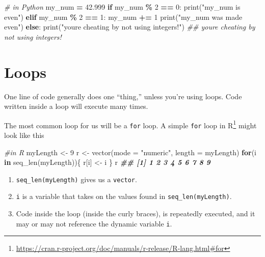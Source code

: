 \documentclass[
  12pt,
  krantz2]{krantz}
\makeatletter
\newenvironment{Shaded}{\begin{snugshade}}{\end{snugshade}}
\newcommand{\AttributeTok}[1]{\textcolor[rgb]{0.61,0.61,0.61}{#1}}
\newcommand{\BuiltInTok}[1]{#1}
\newcommand{\CommentTok}[1]{\textcolor[rgb]{0.37,0.37,0.37}{\textit{#1}}}
\newcommand{\ControlFlowTok}[1]{\textcolor[rgb]{0.27,0.27,0.27}{\textbf{#1}}}
\newcommand{\DecValTok}[1]{\textcolor[rgb]{0.06,0.06,0.06}{#1}}
\newcommand{\DocumentationTok}[1]{\textcolor[rgb]{0.37,0.37,0.37}{\textbf{\textit{#1}}}}
\newcommand{\FloatTok}[1]{\textcolor[rgb]{0.06,0.06,0.06}{#1}}
\newcommand{\FunctionTok}[1]{\textcolor[rgb]{0,0,0}{#1}}
\newcommand{\NormalTok}[1]{#1}
\newcommand{\OperatorTok}[1]{\textcolor[rgb]{0.43,0.43,0.43}{\textbf{#1}}}
\newcommand{\OtherTok}[1]{\textcolor[rgb]{0.37,0.37,0.37}{#1}}
\newcommand{\StringTok}[1]{\textcolor[rgb]{0.5,0.5,0.5}{#1}}
\providecommand{\tightlist}{%
  \setlength{\itemsep}{0pt}\setlength{\parskip}{0pt}}
\renewcommand{\href}[2]{#2\footnote{\url{#1}}}
\newenvironment{kframe}{%
\medskip{}
\setlength{\fboxsep}{.8em}
 \def\at@end@of@kframe{}%
 \ifinner\ifhmode%
  \def\at@end@of@kframe{\end{minipage}}%
  \begin{minipage}{\columnwidth}%
 \fi\fi%
 \def\FrameCommand##1{\hskip\@totalleftmargin \hskip-\fboxsep
 \colorbox{shadecolor}{##1}\hskip-\fboxsep
     \hskip-\linewidth \hskip-\@totalleftmargin \hskip\columnwidth}%
 \MakeFramed {\advance\hsize-\width
   \@totalleftmargin\z@ \linewidth\hsize
   \@setminipage}}%
 {\par\unskip\endMakeFramed%
 \at@end@of@kframe}
\renewenvironment{Shaded}{\begin{kframe}}{\end{kframe}}
\makeatother
\begin{document}
\begin{Shaded}
\begin{Highlighting}[]
\CommentTok{\# in Python}
\NormalTok{my\_num }\OperatorTok{=} \FloatTok{42.999}
\ControlFlowTok{if}\NormalTok{ my\_num }\OperatorTok{\%} \DecValTok{2} \OperatorTok{==} \DecValTok{0}\NormalTok{:}
    \BuiltInTok{print}\NormalTok{(}\StringTok{"my\_num is even"}\NormalTok{)}
\ControlFlowTok{elif}\NormalTok{ my\_num }\OperatorTok{\%} \DecValTok{2} \OperatorTok{==} \DecValTok{1}\NormalTok{:}
\NormalTok{    my\_num }\OperatorTok{+=} \DecValTok{1}
    \BuiltInTok{print}\NormalTok{(}\StringTok{"my\_num was made even"}\NormalTok{)}
\ControlFlowTok{else}\NormalTok{:}
    \BuiltInTok{print}\NormalTok{(}\StringTok{"you\textquotesingle{}re cheating by not using integers!"}\NormalTok{)}
\CommentTok{\#\# you\textquotesingle{}re cheating by not using integers!}
\end{Highlighting}
\end{Shaded}

\hypertarget{loops}{%
\section{Loops}\label{loops}}

One line of code generally does one ``thing,'' unless you're using loops. Code written inside a loop will execute many times.

The most common loop for us will be a \texttt{for} loop. A simple \href{https://cran.r-project.org/doc/manuals/r-release/R-lang.html\#for}{\texttt{for} loop in R} might look like this

\begin{Shaded}
\begin{Highlighting}[]
\CommentTok{\#in R}
\NormalTok{myLength }\OtherTok{\textless{}{-}} \DecValTok{9}
\NormalTok{r }\OtherTok{\textless{}{-}} \FunctionTok{vector}\NormalTok{(}\AttributeTok{mode =} \StringTok{"numeric"}\NormalTok{, }\AttributeTok{length =}\NormalTok{ myLength)}
\ControlFlowTok{for}\NormalTok{(i }\ControlFlowTok{in} \FunctionTok{seq\_len}\NormalTok{(myLength))\{}
\NormalTok{  r[i] }\OtherTok{\textless{}{-}}\NormalTok{ i}
\NormalTok{\}}
\NormalTok{r}
\DocumentationTok{\#\# [1] 1 2 3 4 5 6 7 8 9}
\end{Highlighting}
\end{Shaded}

\begin{enumerate}
\def\labelenumi{\arabic{enumi}.}
\tightlist
\item
  \texttt{seq\_len(myLength)} gives us a \texttt{vector}.
\item
  \texttt{i} is a variable that takes on the values found in \texttt{seq\_len(myLength)}.
\item
  Code inside the loop (inside the curly braces), is repeatedly executed, and it may or may not reference the dynamic variable \texttt{i}.
\end{enumerate}
\end{document}
